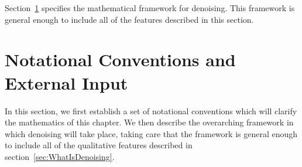 Section~\ref{sec:DenoisingNotationSetup} specifies the mathematical framework for denoising.  This framework is general enough to include all of the features described in this section.

\section{Notational Conventions and External Input}\label{sec:DenoisingNotationSetup}

In this section, we first establish a set of notational conventions which will clarify the mathematics of this chapter.  We then describe the overarching framework in which denoising will take place, taking care that the framework is general enough to include all of the qualitative features described in section~\ref{sec:WhatIsDenoising}.

